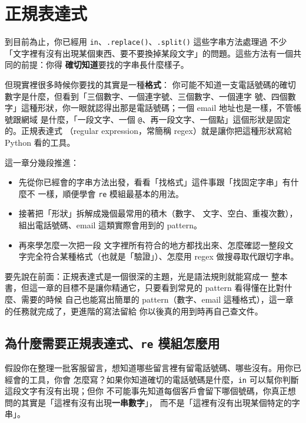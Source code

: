 \chapter{正規表達式}
\label{ch:regex}

到目前為止，你已經用 \texttt{in}、\texttt{.replace()}、\texttt{.split()} 這些字串方法處理過
不少「文字裡有沒有出現某個東西、要不要換掉某段文字」的問題。這些方法有一個共同的前提：你得
\textbf{確切知道}要找的字串長什麼樣子。

但現實裡很多時候你要找的其實是一種\textbf{格式}：
你可能不知道一支電話號碼的確切數字是什麼，但看到「三個數字、一個連字號、三個數字、一個連字
號、四個數字」這種形狀，你一眼就認得出那是電話號碼；一個 email 地址也是一樣，不管帳號跟網域
是什麼，「一段文字、一個 \texttt{@}、再一段文字、一個點」這個形狀是固定的。正規表達式
（regular expression，常簡稱 regex）就是讓你把這種形狀寫給 Python 看的工具。

這一章分幾段推進：

\begin{itemize}
\item 先從你已經會的字串方法出發，看看「找格式」這件事跟「找固定字串」有什麼不
一樣，順便學會 \texttt{re} 模組最基本的用法。
\item 接著把「形狀」拆解成幾個最常用的積木（數字、
文字、空白、重複次數），組出電話號碼、email 這類實際會用到的 pattern。
\item 再來學怎麼一次把一段
文字裡所有符合的地方都找出來、怎麼確認一整段文字完全符合某種格式（也就是「驗證」）、怎麼用
regex 做搜尋取代跟切字串。
\end{itemize}

要先說在前面：正規表達式是一個很深的主題，光是語法規則就能寫成一
整本書，但這一章的目標不是讓你精通它，只要看到常見的 pattern 看得懂在比對什麼、需要的時候
自己也能寫出簡單的 pattern（數字、email 這種格式），這一章的任務就完成了，更進階的寫法留給
你以後真的用到時再自己查文件。

\section{為什麼需要正規表達式、\texttt{re} 模組怎麼用}
\label{sec:regex-basics}

假設你在整理一批客服留言，想知道哪些留言裡有留電話號碼、哪些沒有。用你已經會的工具，你會
怎麼寫？如果你知道確切的電話號碼是什麼，\texttt{in} 可以幫你判斷這段文字有沒有出現；但你
不可能事先知道每個客戶會留下哪個號碼，你真正想問的其實是「這裡有沒有出現\textbf{一串數字}」，
而不是「這裡有沒有出現某個特定的字串」。

